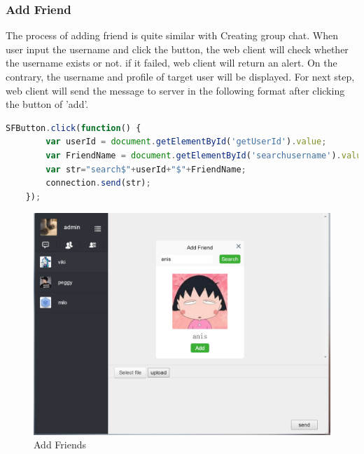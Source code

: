 \documentclass[a4paper,11pt]{article}
\begin{document}
\subsubsection*{Add Friend}
The process of adding friend is quite similar with Creating group chat. When user input the username and click the button, the web client will check whether the username exists or not. if it failed, web client will return an alert. On the contrary, the username and profile of target user will be displayed. For next step, web client will send the message to server in the following format after clicking the button of 'add'.
\begin{lstlisting}[language=javascript]
SFButton.click(function() {
        var userId = document.getElementById('getUserId').value;
        var FriendName = document.getElementById('searchusername').value;
        var str="search$"+userId+"$"+FriendName;
        connection.send(str);
    });
\end{lstlisting}

\begin{figure}[!h]
\centering
\includegraphics[width = 0.9 \textwidth ]{addfriendweb.png}
\caption{\label{fig:UML}Add Friends}
\end{figure}
\end{document}
